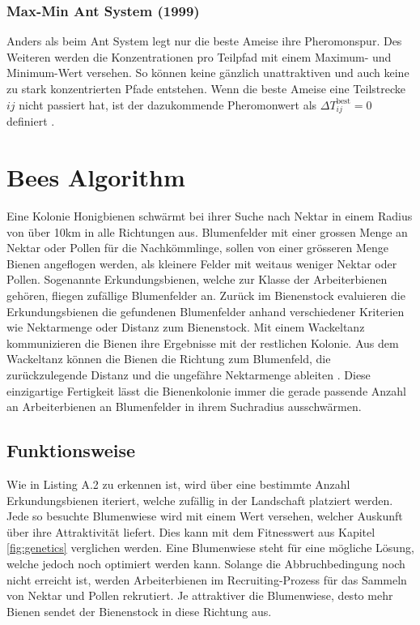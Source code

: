 \subsubsection{Max-Min Ant System (1999)}
Anders als beim Ant System legt nur die beste Ameise ihre Pheromonspur. Des Weiteren werden die
Konzentrationen pro Teilpfad mit einem Maximum- und Minimum-Wert versehen. So können keine gänzlich
unattraktiven und auch keine zu stark konzentrierten Pfade entstehen. Wenn die beste Ameise eine Teilstrecke
$ij$ nicht passiert hat, ist der dazukommende Pheromonwert als $\Delta T_{ij}^\text{best} = 0$ definiert
\cite{Dor07}.


\section{Bees Algorithm}
Eine Kolonie Honigbienen schwärmt bei ihrer Suche nach Nektar in einem Radius von über 10km in alle Richtungen
aus. Blumenfelder mit einer grossen Menge an Nektar oder Pollen für die Nachkömmlinge, sollen von einer
grösseren Menge Bienen angeflogen werden, als kleinere Felder mit weitaus weniger Nektar oder Pollen. Sogenannte
Erkundungsbienen, welche zur Klasse der Arbeiterbienen gehören, fliegen zufällige Blumenfelder an. Zurück im
Bienenstock evaluieren die Erkundungsbienen die gefundenen Blumenfelder anhand verschiedener Kriterien wie
Nektarmenge oder Distanz zum Bienenstock. Mit einem Wackeltanz kommunizieren die Bienen ihre Ergebnisse mit
der restlichen Kolonie. Aus dem Wackeltanz können die Bienen die Richtung zum Blumenfeld, die zurückzulegende
Distanz und die ungefähre Nektarmenge ableiten \cite{Bro11}.
Diese einzigartige Fertigkeit lässt die Bienenkolonie immer die gerade passende Anzahl an Arbeiterbienen an
Blumenfelder in ihrem Suchradius ausschwärmen.

\subsection{Funktionsweise}

Wie in Listing A.2 zu erkennen ist, wird über eine bestimmte Anzahl Erkundungsbienen iteriert, welche zufällig
in der Landschaft platziert werden. Jede so besuchte Blumenwiese wird mit einem Wert versehen, welcher Auskunft
über ihre Attraktivität liefert. Dies kann mit dem Fitnesswert aus Kapitel \ref{fig:genetics} verglichen werden.
Eine Blumenwiese steht für eine mögliche Lösung, welche jedoch noch optimiert werden kann. Solange die
Abbruchbedingung noch nicht erreicht ist, werden Arbeiterbienen im Recruiting-Prozess für das Sammeln
von Nektar und Pollen rekrutiert. Je attraktiver die Blumenwiese, desto mehr Bienen sendet der Bienenstock in diese
Richtung aus.

